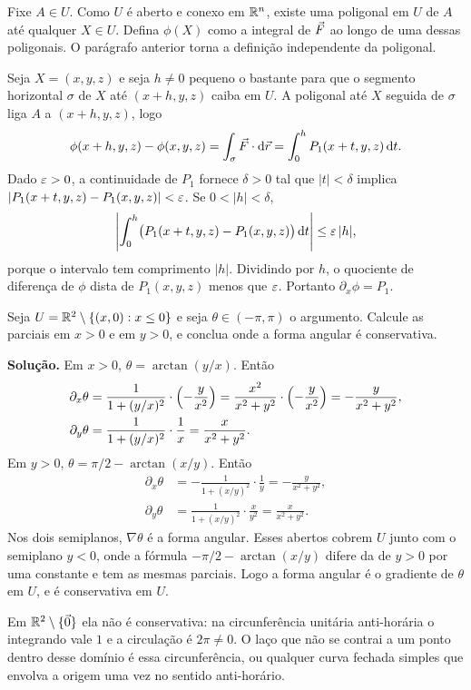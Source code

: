 \documentclass[11pt,a4paper]{article}
\begin{document}
Fixe $A\in U$. Como $U$ é aberto e conexo em $\mathbb{R}^n$, existe uma poligonal em $U$ de $A$ até qualquer $X\in U$. Defina $\phi(X)$ como a integral de $\vec{F}$ ao longo de uma dessas poligonais. O parágrafo anterior torna a definição independente da poligonal.

Seja $X=(x,y,z)$ e seja $h\neq 0$ pequeno o bastante para que o segmento horizontal $\sigma$ de $X$ até $(x+h,y,z)$ caiba em $U$. A poligonal até $X$ seguida de $\sigma$ liga $A$ a $(x+h,y,z)$, logo
\[
\phi(x+h,y,z)-\phi(x,y,z)=\int_\sigma\vec{F}\cdot\mathrm{d}\vec{r}
=\int_0^h P_1(x+t,y,z)\,\mathrm{d} t.
\]
Dado $\varepsilon>0$, a continuidade de $P_1$ fornece $\delta>0$ tal que $|t|<\delta$ implica $|P_1(x+t,y,z)-P_1(x,y,z)|<\varepsilon$. Se $0<|h|<\delta$,
\[
\Biggl|\int_0^h\bigl(P_1(x+t,y,z)-P_1(x,y,z)\bigr)\,\mathrm{d} t\Biggr|\le\varepsilon\,|h|,
\]
porque o intervalo tem comprimento $|h|$. Dividindo por $h$, o quociente de diferença de $\phi$ dista de $P_1(x,y,z)$ menos que $\varepsilon$. Portanto $\partial_x\phi=P_1$.

\begin{exercicio}
Seja $U=\mathbb{R}^2\setminus\{(x,0):x\le 0\}$ e seja $\theta\in(-\pi,\pi)$ o argumento. Calcule as parciais em $x>0$ e em $y>0$, e conclua onde a forma angular é conservativa.
\end{exercicio}

\noindent\textbf{Solução.}
Em $x>0$, $\theta=\arctan(y/x)$. Então
\begin{align*}
\partial_x\theta
&=\frac{1}{1+(y/x)^2}\cdot\Bigl(-\frac{y}{x^2}\Bigr)
=\frac{x^2}{x^2+y^2}\cdot\Bigl(-\frac{y}{x^2}\Bigr)
=-\frac{y}{x^2+y^2},\\
\partial_y\theta
&=\frac{1}{1+(y/x)^2}\cdot\frac{1}{x}
=\frac{x}{x^2+y^2}.
\end{align*}
Em $y>0$, $\theta=\pi/2-\arctan(x/y)$. Então
\begin{align*}
\partial_x\theta
&=-\frac{1}{1+(x/y)^2}\cdot\frac{1}{y}
=-\frac{y}{x^2+y^2},\\
\partial_y\theta
&=\frac{1}{1+(x/y)^2}\cdot\frac{x}{y^2}
=\frac{x}{x^2+y^2}.
\end{align*}
Nos dois semiplanos, $\nabla\theta$ é a forma angular. Esses abertos cobrem $U$ junto com o semiplano $y<0$, onde a fórmula $-\pi/2-\arctan(x/y)$ difere da de $y>0$ por uma constante e tem as mesmas parciais. Logo a forma angular é o gradiente de $\theta$ em $U$, e é conservativa em $U$.

Em $\mathbb{R}^2\setminus\{\vec{0}\}$ ela não é conservativa: na circunferência unitária anti-horária o integrando vale $1$ e a circulação é $2\pi\neq 0$. O laço que não se contrai a um ponto dentro desse domínio é essa circunferência, ou qualquer curva fechada simples que envolva a origem uma vez no sentido anti-horário.
\end{document}
